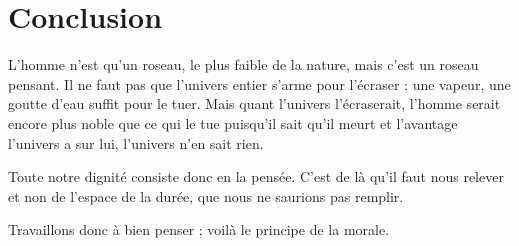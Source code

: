\section{Conclusion}

L'homme n'est qu'un roseau, le plus faible de la nature, mais c'est un roseau pensant.
Il ne faut pas que l'univers entier s'arme pour l'écraser ; une vapeur, une goutte d'eau suffit pour le tuer.
Mais quant l'univers l'écraserait, l'homme serait encore plus noble que ce qui le tue puisqu'il sait qu'il meurt et l'avantage l'univers a sur lui, l'univers n'en sait rien.

Toute notre dignité consiste donc en la pensée.
C'est de là qu'il faut nous relever et non de l'espace de la durée, que nous ne saurions pas remplir.

Travaillons donc à bien penser ; voilà le principe de la morale. \parencite{pascal1670}
